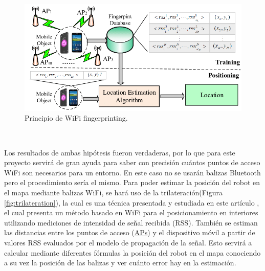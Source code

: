 \begin{figure} [H]
  \begin{center}
    \includegraphics[scale=0.6]{figs/wifi}
  \end{center}
  \caption{Principio de WiFi fingerprinting.}
  \label{fig:wifi}
\end{figure}\

Los resultados de ambas hipótesis fueron verdaderas, por lo que para este proyecto servirá de gran ayuda para saber con precisión cuántos puntos de acceso WiFi son necesarios para un entorno. En este caso no se usarán balizas Bluetooth pero el procedimiento sería el mismo. Para poder estimar la posición del robot en el mapa mediante balizas WiFi, se hará uso de la trilateración(Figura \ref{fig:trilateration}), la cual es una técnica presentada y estudiada en este artículo \cite{inproceedings}, el cual presenta un método basado en WiFi para el posicionamiento en interiores utilizando
mediciones de intensidad de señal recibida (RSS). También se estiman las distancias entre los puntos de acceso (\hyperlink{APs}{APs}) y el dispositivo móvil a partir de
valores RSS evaluados por el modelo de propagación de la señal. Esto servirá a calcular mediante diferentes fórmulas la posición del robot en el mapa conociendo a su vez la posición de las balizas y ver cuánto error hay en la estimación.\\


